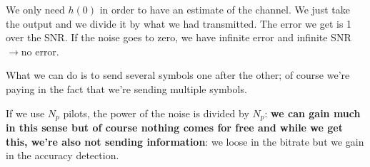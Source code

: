 \documentclass[a4paper, 12pt]{book}
\begin{document}
We only need $h(0)$ in order to have an estimate of the channel.
We just take the output and we divide it by what we had transmitted.
The error we get is 1 over the SNR. If the noise goes to zero, we have infinite error and infinite SNR$\to$no error.

What we can do is to send several symbols one after the other; of course we're paying in the fact that we're sending multiple symbols.

If we use $N_p$ pilots, the power of the noise is divided by $N_p$: \textbf{we can gain much in this sense but of course nothing comes for free and while we get this, we're also not sending information}: we loose in the bitrate but we gain in the accuracy detection.

\vspace{0.5cm}
\end{document}
